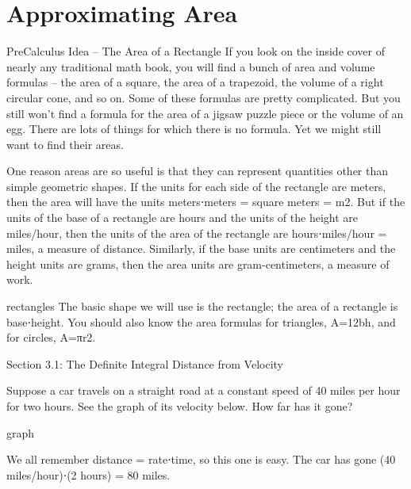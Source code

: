 \section{Approximating Area}
\label{sec:area-approx}
PreCalculus Idea – The Area of a Rectangle
If you look on the inside cover of nearly any traditional math book, you will find a bunch of area and volume formulas – the area of a square, the area of a trapezoid, the volume of a right circular cone, and so on. Some of these formulas are pretty complicated. But you still won't find a formula for the area of a jigsaw puzzle piece or the volume of an egg. There are lots of things for which there is no formula. Yet we might still want to find their areas.

One reason areas are so useful is that they can represent quantities other than simple geometric shapes. If the units for each side of the rectangle are meters, then the area will have the units meters⋅meters = square meters = m2. But if the units of the base of a rectangle are hours and the units of the height are miles/hour, then the units of the area of the rectangle are hours⋅miles/hour = miles, a measure of distance. Similarly, if the base units are centimeters and the height units are grams, then the area units are gram-centimeters, a measure of work.

rectangles
The basic shape we will use is the rectangle; the area of a rectangle is base⋅height. You should also know the area formulas for triangles, A=12bh, and for circles, A=πr2.

Section 3.1: The Definite Integral
Distance from Velocity
\begin{example}
Suppose a car travels on a straight road at a constant speed of 40 miles per hour for two hours. See the graph of its velocity below. How far has it gone?

graph
\begin{solution}
We all remember distance = rate⋅time, so this one is easy. The car has gone (40 miles/hour)⋅(2 hours) = 80 miles.
\end{solution}\end{example}

